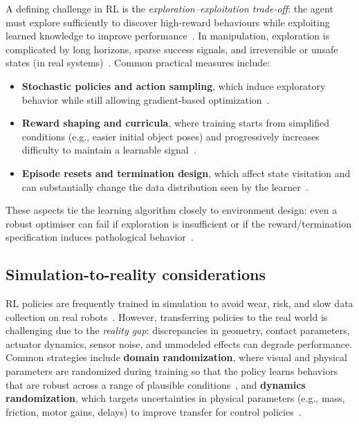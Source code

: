 A defining challenge in \ac{RL} is the \emph{exploration--exploitation trade-off}: the agent must explore sufficiently to
discover high-reward behaviours while exploiting learned knowledge to improve performance~\cite{SuttonBarto2018}.
In manipulation, exploration is complicated by long horizons, sparse success signals, and irreversible or
unsafe states (in real systems)~\cite{Kober2013Survey}. Common practical measures include:
\begin{itemize}
  \item \textbf{Stochastic policies and action sampling}, which induce exploratory behavior while still allowing
  gradient-based optimization~\cite{SuttonBarto2018}.
  \item \textbf{Reward shaping and curricula}, where training starts from simplified conditions (e.g., easier initial
  object poses) and progressively increases difficulty to maintain a learnable signal~\cite{Kober2013Survey}.
  \item \textbf{Episode resets and termination design}, which affect state visitation and can substantially change the
  data distribution seen by the learner~\cite{Kober2013Survey}.
\end{itemize}
These aspects tie the learning algorithm closely to environment design: even a robust optimiser can fail if exploration
is insufficient or if the reward/termination specification induces pathological behavior~\cite{Kober2013Survey,SuttonBarto2018}.

\subsection{Simulation-to-reality considerations}
\label{sec:rl_sim2real}

\ac{RL} policies are frequently trained in simulation to avoid wear, risk, and slow data collection on real robots~\cite{Kober2013Survey}.
However, transferring policies to the real world is challenging due to the \emph{reality gap}: discrepancies in geometry,
contact parameters, actuator dynamics, sensor noise, and unmodeled effects can degrade performance.
Common strategies include \textbf{domain randomization}, where visual and physical parameters are randomized during training so that
the policy learns behaviors that are robust across a range of plausible conditions~\cite{Tobin2017DomainRand}, and
\textbf{dynamics randomization}, which targets uncertainties in physical parameters (e.g., mass,
friction, motor gains, delays) to improve transfer for control policies~\cite{Peng2018DynamicsRand}.

